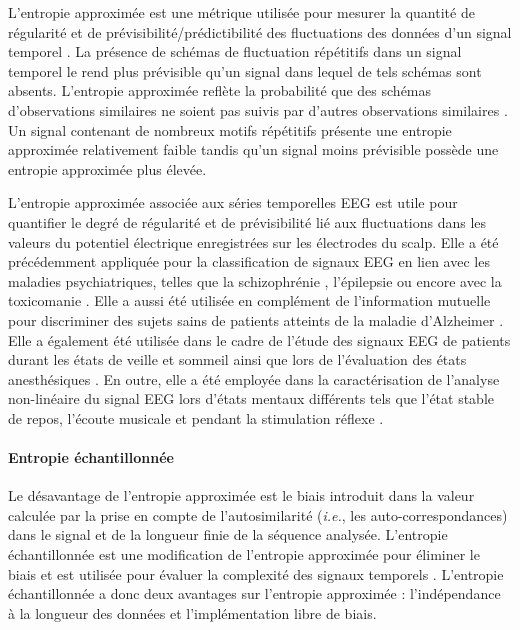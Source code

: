 L'entropie approximée est une métrique utilisée pour mesurer la quantité de régularité et de prévisibilité/prédictibilité des fluctuations des données d'un signal temporel \citep{pincus1991regularity, pincus1991approximate}. 
La présence de schémas de fluctuation répétitifs dans un signal temporel le rend plus prévisible qu'un signal dans lequel de tels schémas sont absents. 
L'entropie approximée reflète la probabilité que des schémas d'observations similaires ne soient pas suivis par d'autres observations similaires \citep{ho1997predicting}. 
Un signal contenant de nombreux motifs répétitifs présente une entropie approximée relativement faible tandis qu'un signal moins prévisible possède une entropie approximée plus élevée. 

L'entropie approximée associée aux séries temporelles EEG est utile pour quantifier le degré de régularité et de prévisibilité lié aux fluctuations dans les valeurs du potentiel électrique enregistrées sur les électrodes du scalp. 
Elle a été précédemment appliquée pour la classification de signaux EEG en lien avec les maladies psychiatriques, telles que la schizophrénie \citep{sabeti2009entropy}, l'épilepsie \citep{giannakakis2013approach, yuan2011epileptic} ou encore avec la toxicomanie \citep{yun2012decreased}. 
Elle a aussi été utilisée en complément de l'information mutuelle pour discriminer des sujets sains de patients atteints de la maladie d'Alzheimer \citep{abasolo2008approximate}. 
Elle a également été utilisée dans le cadre de l'étude des signaux EEG de patients durant les états de veille et sommeil \citep{burioka2005approximate} ainsi que lors de l'évaluation des états anesthésiques \citep{benzy2015approximate, bruhn2000approximate, bruhn2003correlation, hudetz2003cholinergic, liang2015eeg}. 
En outre, elle a été employée dans la caractérisation de l'analyse non-linéaire du signal EEG lors d'états mentaux différents tels que l'état stable de repos, l'écoute musicale et pendant la stimulation réflexe \citep{natarajan2004nonlinear}.

\paragraph{Entropie échantillonnée\\}
\label{saen}

Le désavantage de l’entropie approximée est le biais introduit dans la valeur calculée par la prise en compte de l’autosimilarité (\textit{i.e.}, les auto-correspondances) dans le signal et de la longueur finie de la séquence analysée. 
L'entropie échantillonnée est une modification de l’entropie approximée pour éliminer le biais et est utilisée pour évaluer la complexité des signaux temporels \citep{richman2000physiological}. 
L'entropie échantillonnée a donc deux avantages sur l’entropie approximée : l'indépendance à la longueur des données et l'implémentation libre de biais. 

